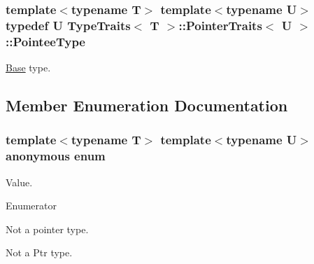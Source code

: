 \subsubsection[{\texorpdfstring{Pointee\+Type}{PointeeType}}]{\setlength{\rightskip}{0pt plus 5cm}template$<$typename T$>$ template$<$typename U$>$ typedef U {\bf Type\+Traits}$<$ T $>$\+::{\bf Pointer\+Traits}$<$ U $>$\+::{\bf Pointee\+Type}}\hypertarget{structTypeTraits_1_1PointerTraits_a24acc803e3ec4795ae2ec7367de03d4d}{}\label{structTypeTraits_1_1PointerTraits_a24acc803e3ec4795ae2ec7367de03d4d}
\hyperlink{structTypeTraits_1_1Base}{Base} type. 

\subsection{Member Enumeration Documentation}
\subsubsection[{\texorpdfstring{anonymous enum}{anonymous enum}}]{\setlength{\rightskip}{0pt plus 5cm}template$<$typename T$>$ template$<$typename U$>$ anonymous enum}\hypertarget{structTypeTraits_1_1PointerTraits_aa347275cb9f15c69a7d822f06fc1ff18}{}\label{structTypeTraits_1_1PointerTraits_aa347275cb9f15c69a7d822f06fc1ff18}
Value. \begin{Desc}
\item[Enumerator]\par
\begin{description}
\item[{\em 
Is\+Pointer\hypertarget{structTypeTraits_1_1PointerTraits_aa347275cb9f15c69a7d822f06fc1ff18a9da4883944a6a2b7d823915154aead18}{}\label{structTypeTraits_1_1PointerTraits_aa347275cb9f15c69a7d822f06fc1ff18a9da4883944a6a2b7d823915154aead18}
}]Not a pointer type. \item[{\em 
Is\+Ptr\hypertarget{structTypeTraits_1_1PointerTraits_aa347275cb9f15c69a7d822f06fc1ff18acc0995ad6c0463570690189171f3d619}{}\label{structTypeTraits_1_1PointerTraits_aa347275cb9f15c69a7d822f06fc1ff18acc0995ad6c0463570690189171f3d619}
}]Not a Ptr type. \end{description}
\end{Desc}

